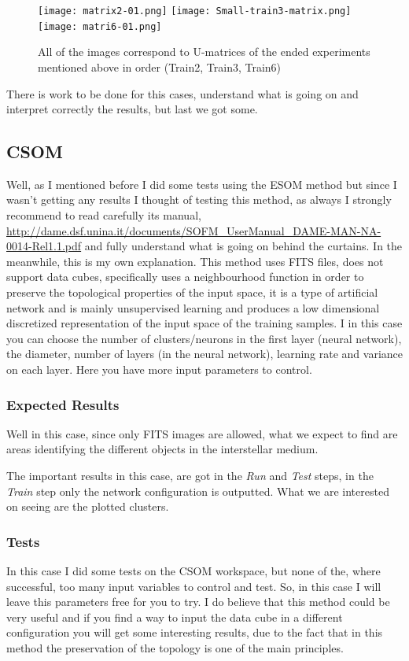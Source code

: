 \documentclass[11pt,fleqn]{book} %
\begin{document}
\begin{figure}[h!]
	\centering
    \texttt{[image: matrix2-01.png]}
    \texttt{[image: Small-train3-matrix.png]}
    \texttt{[image: matri6-01.png]}
    \caption{All of the images correspond to U-matrices of the ended experiments mentioned above in order (Train2, Train3, Train6)}
    \label{img:matrixended}
\end{figure}
 There is work to be done for this cases, understand what is going on and interpret correctly the results, but last we got some.
\subsection{CSOM}
Well, as I mentioned before I did some tests using the ESOM method but since I wasn't getting any results I thought of testing this method, as always I strongly recommend to read carefully its manual, \url{http://dame.dsf.unina.it/documents/SOFM_UserManual_DAME-MAN-NA-0014-Rel1.1.pdf} and fully understand what is going on behind the curtains. In the meanwhile, this is my own explanation. This method uses FITS files, does not support data cubes, specifically uses a neighbourhood function in order to preserve the topological properties of the input space, it is a type of artificial network and is mainly unsupervised learning  and produces a low dimensional discretized representation of the input space of the training samples. I in this case you can choose the number of clusters/neurons in the first layer (neural network), the diameter, number of layers (in the neural network), learning rate and variance  on each layer. Here you have more input parameters to control.
\subsubsection{Expected Results}
Well in this case, since only FITS images are allowed, what we expect to find are areas identifying the different objects in the interstellar medium.

The important results in this case, are got in the \emph{Run} and \emph{Test} steps, in the \emph{Train} step only the network configuration is outputted. What we are interested on seeing are the plotted clusters.
\subsubsection{Tests}
In this case I did some tests on the CSOM workspace, but none of the, where successful, too many input variables to control and test. So, in this case I will leave this parameters free for you to try. I do believe that this method could be very useful and if you find a way to input the data cube in a different configuration you will get some interesting results, due to the fact that in this method the preservation of the topology is one of the main principles.
\end{document}

